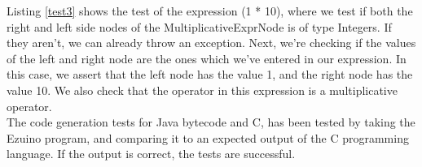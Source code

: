 Listing \ref{test3} shows the test of the expression (1 * 10), where we test if both the right and left side nodes of the MultiplicativeExprNode is of type Integers. If they aren’t, we can already throw an exception. Next, we’re checking if the values of the left and right node are the ones which we’ve entered in our expression. In this case, we assert that the left node has the value 1, and the right node has the value 10.  We also check that the operator in this expression is a multiplicative operator.\\
The code generation tests for Java bytecode and C, has been tested by taking the Ezuino program, and comparing it to an expected output of the C programming language. If the output is correct, the tests are successful.

\noindent\newline

